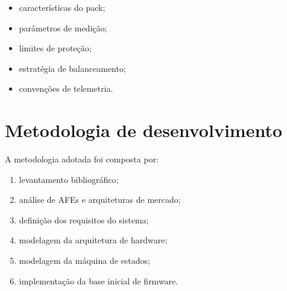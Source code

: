 \begin{itemize}
  \item características do pack;
  \item parâmetros de medição;
  \item limites de proteção;
  \item estratégia de balanceamento;
  \item convenções de telemetria.
\end{itemize}

\section{Metodologia de desenvolvimento}

A metodologia adotada foi composta por:

\begin{enumerate}
  \item levantamento bibliográfico;
  \item análise de AFEs e arquiteturas de mercado;
  \item definição dos requisitos do sistema;
  \item modelagem da arquitetura de hardware;
  \item modelagem da máquina de estados;
  \item implementação da base inicial de firmware.
\end{enumerate}
